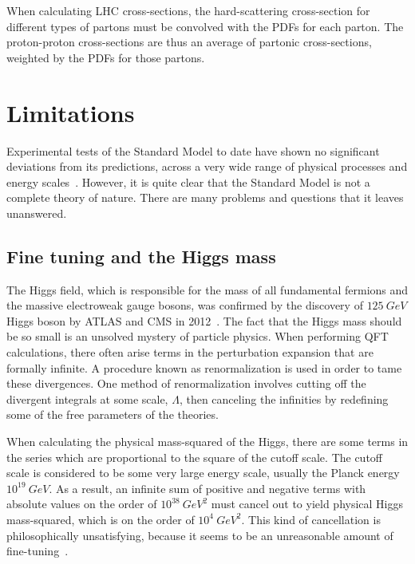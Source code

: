 When calculating LHC cross-sections, the hard-scattering cross-section for different types of partons
must be convolved with the PDFs for each parton.
The proton-proton cross-sections are thus an average of partonic cross-sections, weighted by the PDFs for those partons.

\section{Limitations}\label{sec:sm_limits}

Experimental tests of the Standard Model to date have shown no significant deviations from its predictions,
across a very wide range of physical processes and energy scales~\cite{sm-summary-plots}.
However, it is quite clear that the Standard Model is not a complete theory of nature.
There are many problems and questions that it leaves unanswered.

\subsection{Fine tuning and the Higgs mass}\label{subsec:sm_hierarchy}

The Higgs field, which is responsible for the mass of all fundamental fermions and the massive electroweak gauge bosons, was confirmed by the discovery of $125~GeV$ Higgs boson by ATLAS and CMS in 2012~\cite{sm-higgs-discovery-atlas,sm-higgs-discovery-cms}.
The fact that the Higgs mass should be so small is an unsolved mystery of particle physics.
When performing QFT calculations, there often arise terms in the perturbation expansion that are formally infinite.
A procedure known as renormalization is used in order to tame these divergences.
One method of renormalization involves cutting off the divergent integrals at some scale, $\Lambda$, then canceling the infinities by redefining some of the free parameters of the theories.

When calculating the physical mass-squared of the Higgs, there are some terms in the series which are proportional to the square of the cutoff scale.
The cutoff scale is considered to be some very large energy scale, usually the Planck energy $10^{19}~GeV$.
As a result, an infinite sum of positive and negative terms with absolute values on the order of $10^{38}~GeV^2$ must cancel out to yield physical Higgs mass-squared, which is on the order of $10^4~GeV^2$.
This kind of cancellation is philosophically unsatisfying, because it seems to be an unreasonable amount of fine-tuning~\cite{sm-higgs-naturalness}.

